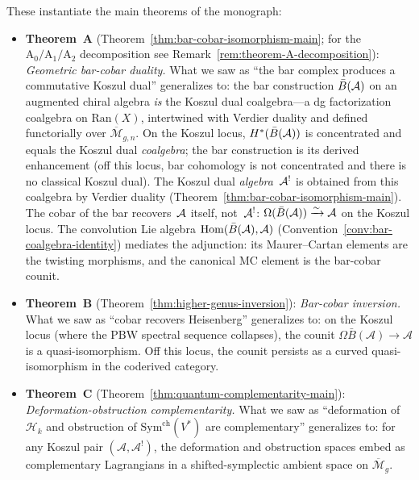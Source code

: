 These instantiate the main theorems of the monograph:

\begin{itemize}
\item \textbf{Theorem~A}
  (Theorem~\ref{thm:bar-cobar-isomorphism-main};
  for the $\mathrm{A}_0/\mathrm{A}_1/\mathrm{A}_2$ decomposition
  see Remark~\ref{rem:theorem-A-decomposition}):
  \emph{Geometric bar-cobar duality.}
  What we saw as ``the bar complex produces a commutative Koszul
  dual'' generalizes to: the bar construction $\bar{B}(\mathcal{A})$ on an augmented chiral
  algebra \emph{is} the Koszul dual coalgebra---a dg factorization
  coalgebra on $\mathrm{Ran}(X)$, intertwined with Verdier duality
  and defined functorially over $\overline{\mathcal{M}}_{g,n}$.
  On the Koszul locus, $H^*(\bar{B}(\mathcal{A}))$ is concentrated
  and equals the Koszul dual \emph{coalgebra}; the bar construction
  is its derived enhancement (off this locus, bar cohomology is
  not concentrated and there is no classical Koszul dual).  The Koszul dual \emph{algebra}~$\mathcal{A}^!$ is obtained
  from this coalgebra by Verdier duality
  (Theorem~\ref{thm:bar-cobar-isomorphism-main}).  The cobar
  of the bar recovers~$\mathcal{A}$ itself, not~$\mathcal{A}^!$:
  $\Omega(\bar{B}(\mathcal{A})) \xrightarrow{\sim} \mathcal{A}$ on the Koszul locus.
  The convolution Lie algebra
  $\mathrm{Hom}(\bar{B}(\mathcal{A}), \mathcal{A})$
  (Convention~\ref{conv:bar-coalgebra-identity})
  mediates the adjunction: its Maurer--Cartan elements are the
  twisting morphisms, and the canonical MC element is the
  bar-cobar counit.

\item \textbf{Theorem~B}
  (Theorem~\ref{thm:higher-genus-inversion}):
  \emph{Bar-cobar inversion.}
  What we saw as ``cobar recovers Heisenberg'' generalizes to:
  on the Koszul locus (where the PBW spectral sequence collapses),
  the counit $\Omega \bar{B}(\mathcal{A}) \to \mathcal{A}$ is a
  quasi-isomorphism.  Off this locus, the counit persists as a
  curved quasi-isomorphism in the coderived category.

\item \textbf{Theorem~C}
  (Theorem~\ref{thm:quantum-complementarity-main}):
  \emph{Deformation-obstruction complementarity.}
  What we saw as ``deformation of $\mathcal{H}_k$ and obstruction
  of $\mathrm{Sym}^{\mathrm{ch}}(V^*)$ are complementary''
  generalizes to: for any Koszul pair $(\mathcal{A},
  \mathcal{A}^!)$, the deformation and obstruction spaces embed
  as complementary Lagrangians in a shifted-symplectic ambient
  space on $\overline{\mathcal{M}}_g$.
\end{itemize}

